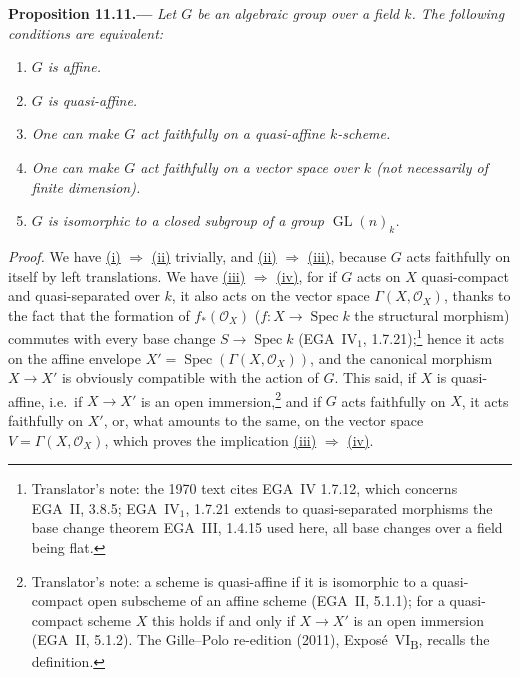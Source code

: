\medskip
{}\label{prop:sga3-VIB-11.11}%
\noindent\textbf{Proposition 11.11.---}
\emph{Let \(G\) be an algebraic group over a field \(k\).
The following conditions are equivalent:}
\begin{enumerate}
\item[\textup{(i)}]\label{concl:sga3-VIB-11.11-i}
  \emph{\(G\) is affine.}
\item[\textup{(ii)}]\label{concl:sga3-VIB-11.11-ii}
  \emph{\(G\) is quasi-affine.}
\item[\textup{(iii)}]\label{concl:sga3-VIB-11.11-iii}
  \emph{One can make \(G\) act faithfully on a quasi-affine
  \(k\)-scheme.}
\item[\textup{(iv)}]\label{concl:sga3-VIB-11.11-iv}
  \emph{One can make \(G\) act faithfully on a vector space
  over \(k\) \textup{(not necessarily of finite dimension)}.}
\item[\textup{(v)}]\label{concl:sga3-VIB-11.11-v}
  \emph{\(G\) is isomorphic to a closed subgroup of a group
  \(\operatorname{GL}(n)_k\).}
\end{enumerate}

\emph{Proof.}
We have \hyperref[concl:sga3-VIB-11.11-i]{\textup{(i)}}
\(\Rightarrow\)
\hyperref[concl:sga3-VIB-11.11-ii]{\textup{(ii)}} trivially, and
\hyperref[concl:sga3-VIB-11.11-ii]{\textup{(ii)}}
\(\Rightarrow\)
\hyperref[concl:sga3-VIB-11.11-iii]{\textup{(iii)}}, because
\(G\) acts faithfully on itself by left translations. We have
\hyperref[concl:sga3-VIB-11.11-iii]{\textup{(iii)}}
\(\Rightarrow\)
\hyperref[concl:sga3-VIB-11.11-iv]{\textup{(iv)}}, for if \(G\)
acts on \(X\) quasi-compact and quasi-separated over \(k\), it
also acts on the vector space \(\Gamma(X,\mathcal O_X)\), thanks
to the fact that the formation of \(f_*(\mathcal O_X)\)
\textup{(}\(f:X\to\operatorname{Spec}k\) the structural
morphism\textup{)} commutes with every base change
\(S\to\operatorname{Spec}k\) \textup{(EGA~IV\(_1\),
1.7.21)};\footnote{Translator's note: the 1970 text cites EGA~IV
1.7.12, which concerns EGA~II, 3.8.5; EGA~IV\(_1\), 1.7.21 extends
to quasi-separated morphisms the base change theorem EGA~III,
1.4.15 used here, all base changes over a field being flat.}
hence it acts on the affine envelope
\(X'=\operatorname{Spec}(\Gamma(X,\mathcal O_X))\), and the
canonical morphism \(X\to X'\) is obviously compatible with the
action of \(G\). This said, if \(X\) is quasi-affine, i.e.\
if \(X\to X'\) is an open immersion,\footnote{Translator's note: a scheme is quasi-affine if it is isomorphic to a
quasi-compact open subscheme of an affine scheme (EGA~II, 5.1.1); for a quasi-compact scheme \(X\) this holds if
and only if \(X\to X'\) is an open immersion (EGA~II, 5.1.2). The Gille--Polo re-edition (2011),
Expos\'e~VI\textsubscript{B}, recalls the definition.}
and if \(G\) acts faithfully on \(X\), it acts faithfully on
\(X'\), or, what amounts to the same, on the vector space
\(V=\Gamma(X,\mathcal O_X)\), which proves the implication
\hyperref[concl:sga3-VIB-11.11-iii]{\textup{(iii)}}
\(\Rightarrow\)
\hyperref[concl:sga3-VIB-11.11-iv]{\textup{(iv)}}.

